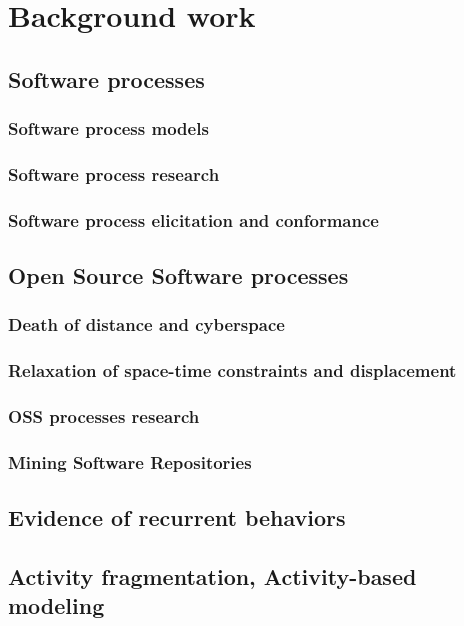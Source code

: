 \chapter{Background work}

\section{Software processes}
\subsection{Software process models}
\subsection{Software process research}
\subsection{Software process elicitation and conformance}

\section{Open Source Software processes}
\subsection{Death of distance and cyberspace}
\subsection{Relaxation of space-time constraints and displacement}
\subsection{OSS processes research}
\subsection{Mining Software Repositories}\label{mackground.msr.summary}


\section{Evidence of recurrent behaviors}

\section{Activity fragmentation, Activity-based modeling}

